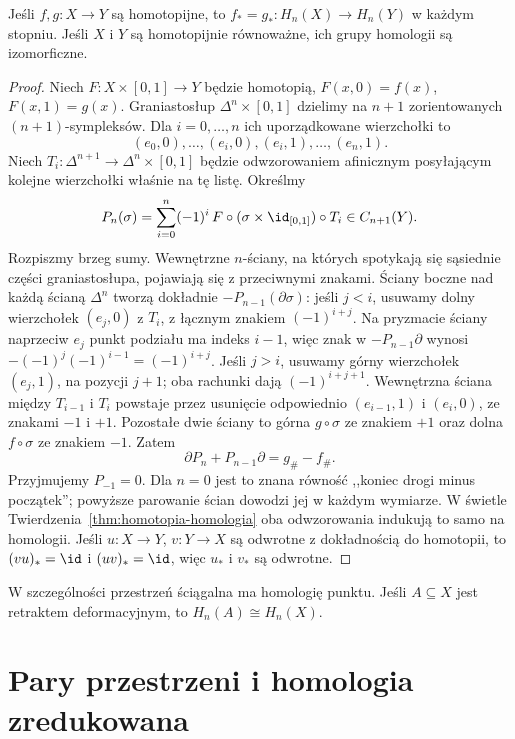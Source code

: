 \begin{twierdzenie}
\label{thm:homotopia-singularna}
Jeśli $f,g:X\to Y$ są homotopijne, to
$f_*=g_*:H_n(X)\to H_n(Y)$ w każdym stopniu.
Jeśli $X$ i $Y$ są homotopijnie równoważne,
ich grupy homologii są izomorficzne.
\end{twierdzenie}
\begin{proof}
Niech $F:X\times[0,1]\to Y$ będzie
homotopią, $F(x,0)=f(x)$,
$F(x,1)=g(x)$.
Graniastosłup $\Delta^n\times[0,1]$
dzielimy na $n+1$ zorientowanych
$(n+1)$-sympleksów. Dla $i=0,\ldots,n$
ich uporządkowane wierzchołki to
\[
 (e_0,0),\ldots,(e_i,0),
 (e_i,1),\ldots,(e_n,1).
\]
Niech $T_i:\Delta^{n+1}\to
\Delta^n\times[0,1]$ będzie odwzorowaniem
afinicznym posyłającym kolejne wierzchołki
właśnie na tę listę. Określmy
\[
 P_n(\sigma)=\sum_{i=0}^n(-1)^i\,
 F\circ(\sigma\times\id_{[0,1]})\circ T_i
 \in C_{n+1}(Y).
\]
Rozpiszmy brzeg sumy. Wewnętrzne
$n$-ściany, na których spotykają się
sąsiednie części graniastosłupa,
pojawiają się z przeciwnymi znakami.
Ściany boczne nad każdą ścianą
$\Delta^n$ tworzą dokładnie
$-P_{n-1}(\partial\sigma)$:
jeśli $j<i$, usuwamy dolny wierzchołek $(e_j,0)$
z $T_i$, z łącznym znakiem $(-1)^{i+j}$.
Na pryzmacie ściany naprzeciw $e_j$ punkt podziału ma indeks $i-1$,
więc znak w $-P_{n-1}\partial$ wynosi
$-(-1)^j(-1)^{i-1}=(-1)^{i+j}$.
Jeśli $j>i$, usuwamy górny wierzchołek $(e_j,1)$,
na pozycji $j+1$; oba rachunki dają $(-1)^{i+j+1}$.
Wewnętrzna ściana między $T_{i-1}$ i $T_i$ powstaje
przez usunięcie odpowiednio $(e_{i-1},1)$ i $(e_i,0)$,
ze znakami $-1$ i $+1$.
Pozostałe dwie ściany to górna
$g\circ\sigma$ ze znakiem $+1$
oraz dolna $f\circ\sigma$ ze
znakiem $-1$. Zatem
\begin{equation}\label{eq:prism-identity}
 \partial P_n+P_{n-1}\partial
 =g_\#-f_\#.
\end{equation}
Przyjmujemy $P_{-1}=0$. Dla $n=0$ jest to znana równość
,,koniec drogi minus początek'';
powyższe parowanie ścian dowodzi
jej w każdym wymiarze. W świetle
Twierdzenia~\ref{thm:homotopia-homologia}
oba odwzorowania indukują to samo na homologii.
Jeśli $u:X\to Y$, $v:Y\to X$
są odwrotne z dokładnością do homotopii,
to $(vu)_*=\id$ i $(uv)_*=\id$,
więc $u_*$ i $v_*$ są odwrotne.
\end{proof}

W szczególności przestrzeń ściągalna
ma homologię punktu. Jeśli
$A\subseteq X$ jest retraktem
deformacyjnym, to $H_n(A)\cong H_n(X)$.

\section{Pary przestrzeni i homologia zredukowana}
\label{sec:homologia-wzgledna}

